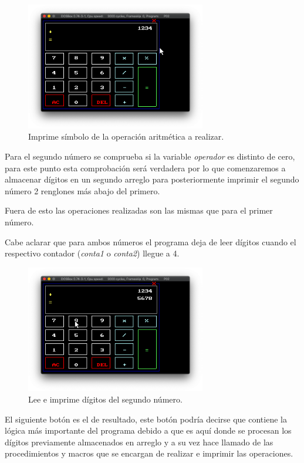 \documentclass[letterpaper,12 pt,titlepage]{article}
\begin{document}
    \begin{figure}[H]
    \centering
    \includegraphics[width=0.7\textwidth]{img/23.png}
    \caption{Imprime símbolo de la operación aritmética a realizar.}
    \end{figure}

    Para el segundo número se comprueba si la variable \textit{operador} es distinto de cero, para este punto esta comprobación será verdadera por lo que comenzaremos a almacenar dígitos en un segundo arreglo para posteriormente imprimir el segundo número 2 renglones más abajo del primero.

    Fuera de esto las operaciones realizadas son las mismas que para el primer número.

    Cabe aclarar que para ambos números el programa deja de leer dígitos cuando el respectivo contador (\textit{conta1} o \textit{conta2}) llegue a 4.

    \begin{figure}[H]
    \centering
    \includegraphics[width=0.7\textwidth]{img/24.png}
    \caption{Lee e imprime dígitos del segundo número.}
    \end{figure}

    El siguiente botón es el de resultado, este botón podría decirse que contiene la lógica más importante del programa debido a que es aquí donde se procesan los dígitos previamente almacenados en arreglo y a su vez hace llamado de las procedimientos y macros que se encargan de realizar e imprimir las operaciones.
\end{document}
